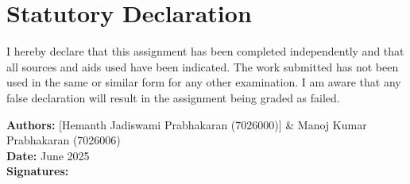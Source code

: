 \chapter*{Statutory Declaration}

I hereby declare that this assignment has been completed independently and that all sources and aids used have been indicated. The work submitted has not been used in the same or similar form for any other examination. I am aware that any false declaration will result in the assignment being graded as failed.

\vspace{2cm}

\textbf{Authors:} [Hemanth Jadiswami Prabhakaran (7026000)] \& Manoj Kumar Prabhakaran (7026006)\\[0.5cm]
\textbf{Date:} June 2025\\[1cm]
\textbf{Signatures:} \underline{\hspace{4cm}} \underline{\hspace{4cm}}
